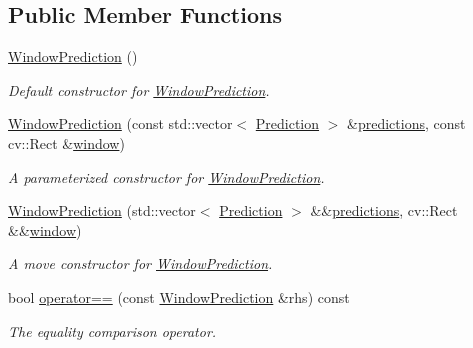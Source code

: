 \subsection*{Public Member Functions}
\begin{DoxyCompactItemize}
\item 
\hyperlink{group___classification_module_ga6337a86649fa61f2b4e122a35aa06bf6}{Window\+Prediction} ()
\begin{DoxyCompactList}\small\item\em Default constructor for \hyperlink{structdg_1_1deepcore_1_1classification_1_1_window_prediction}{Window\+Prediction}. \end{DoxyCompactList}\item 
\hyperlink{group___classification_module_gaa68db23c3bebd48d26ac60872a7f4f9c}{Window\+Prediction} (const std\+::vector$<$ \hyperlink{structdg_1_1deepcore_1_1classification_1_1_prediction}{Prediction} $>$ \&\hyperlink{group___classification_module_gaaec179dc0e22d9c897260b650c2a6b82}{predictions}, const cv\+::\+Rect \&\hyperlink{group___classification_module_ga200902328358f2246a5e62d390e57278}{window})
\begin{DoxyCompactList}\small\item\em A parameterized constructor for \hyperlink{structdg_1_1deepcore_1_1classification_1_1_window_prediction}{Window\+Prediction}. \end{DoxyCompactList}\item 
\hyperlink{group___classification_module_ga22fb55b25a1827cd37a05b7ac72edc2c}{Window\+Prediction} (std\+::vector$<$ \hyperlink{structdg_1_1deepcore_1_1classification_1_1_prediction}{Prediction} $>$ \&\&\hyperlink{group___classification_module_gaaec179dc0e22d9c897260b650c2a6b82}{predictions}, cv\+::\+Rect \&\&\hyperlink{group___classification_module_ga200902328358f2246a5e62d390e57278}{window})
\begin{DoxyCompactList}\small\item\em A move constructor for \hyperlink{structdg_1_1deepcore_1_1classification_1_1_window_prediction}{Window\+Prediction}. \end{DoxyCompactList}\item 
bool \hyperlink{structdg_1_1deepcore_1_1classification_1_1_window_prediction_a818bdc4e9168d4d1b1fbca0b68180608}{operator==} (const \hyperlink{structdg_1_1deepcore_1_1classification_1_1_window_prediction}{Window\+Prediction} \&rhs) const 
\begin{DoxyCompactList}\small\item\em The equality comparison operator. \end{DoxyCompactList}\end{DoxyCompactItemize}
